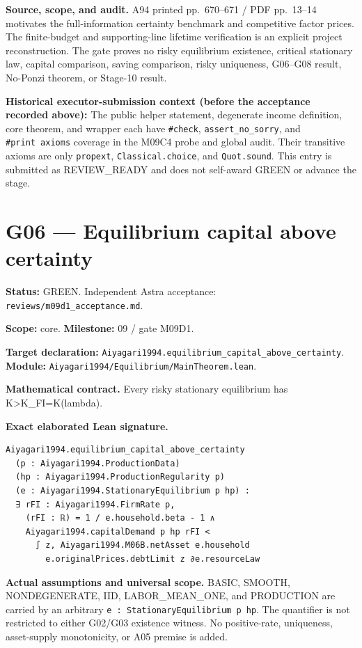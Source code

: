 \documentclass[
  11pt,
]{article}
\let\LedgerOriginalTexttt\texttt
\renewcommand{\texttt}[1]{{\small\LedgerOriginalTexttt{#1}}}
\begin{document}
\textbf{Source, scope, and audit.} A94 printed pp.~670--671 / PDF
pp.~13--14 motivates the full-information certainty benchmark and
competitive factor prices. The finite-budget and supporting-line
lifetime verification is an explicit project reconstruction. The gate
proves no risky equilibrium existence, critical stationary law, capital
comparison, saving comparison, risky uniqueness, G06--G08 result,
No-Ponzi theorem, or Stage-10 result.

\textbf{Historical executor-submission context (before the acceptance
recorded above):} The public helper statement, degenerate income
definition, core theorem, and wrapper each have \texttt{\#check},
\texttt{assert\_no\_sorry}, and \texttt{\#print\ axioms} coverage in the
M09C4 probe and global audit. Their transitive axioms are only
\texttt{propext}, \texttt{Classical.choice}, and \texttt{Quot.sound}.
This entry is submitted as REVIEW\_READY and does not self-award GREEN
or advance the stage.

\section{G06 --- Equilibrium capital above
certainty}\label{g06-equilibrium-capital-above-certainty}

\textbf{Status:} GREEN. Independent Astra acceptance:
\texttt{reviews/m09d1\_acceptance.md}.

\textbf{Scope:} core. \textbf{Milestone:} 09 / gate M09D1.

\textbf{Target declaration:}
\texttt{Aiyagari1994.equilibrium\_capital\_above\_certainty}.\\
\textbf{Module:} \texttt{Aiyagari1994/Equilibrium/MainTheorem.lean}.

\textbf{Mathematical contract.} Every risky stationary equilibrium has
K\textgreater K\_FI=K(lambda).

\textbf{Exact elaborated Lean signature.}

\begin{verbatim}
Aiyagari1994.equilibrium_capital_above_certainty
  (p : Aiyagari1994.ProductionData)
  (hp : Aiyagari1994.ProductionRegularity p)
  (e : Aiyagari1994.StationaryEquilibrium p hp) :
  ∃ rFI : Aiyagari1994.FirmRate p,
    (rFI : ℝ) = 1 / e.household.beta - 1 ∧
    Aiyagari1994.capitalDemand p hp rFI <
      ∫ z, Aiyagari1994.M06B.netAsset e.household
        e.originalPrices.debtLimit z ∂e.resourceLaw
\end{verbatim}

\textbf{Actual assumptions and universal scope.} BASIC, SMOOTH,
NONDEGENERATE, IID, LABOR\_MEAN\_ONE, and PRODUCTION are carried by an
arbitrary \texttt{e\ :\ StationaryEquilibrium\ p\ hp}. The quantifier is
not restricted to either G02/G03 existence witness. No positive-rate,
uniqueness, asset-supply monotonicity, or A05 premise is added.
\end{document}
